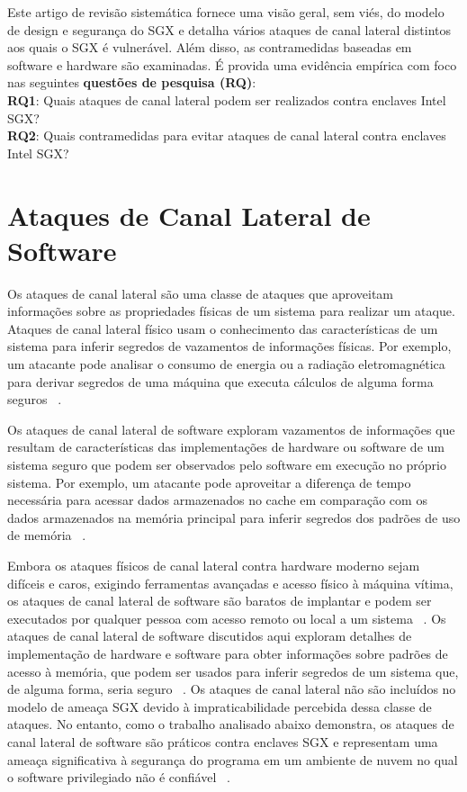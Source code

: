 \documentclass[review]{elsarticle}
\begin{document}
Este artigo de revisão sistemática fornece uma visão geral, sem viés, do modelo de design e segurança do SGX e detalha vários ataques de canal lateral distintos aos quais o SGX é vulnerável. Além disso, as contramedidas baseadas em software e hardware são examinadas. É provida uma evidência empírica com foco nas seguintes \textbf{questões de pesquisa (RQ)}: \\\textbf{RQ1}: Quais ataques de canal lateral podem ser realizados contra enclaves Intel SGX?\\ \textbf{RQ2}: Quais contramedidas para evitar ataques de canal lateral contra enclaves Intel SGX?

\section{Ataques de Canal Lateral de Software}

Os ataques de canal lateral são uma classe de ataques que aproveitam informações sobre as propriedades físicas de um sistema para realizar um ataque. Ataques de canal lateral físico usam o conhecimento das características de um sistema para inferir segredos de vazamentos de informações físicas. Por exemplo, um atacante pode analisar o consumo de energia ou a radiação eletromagnética para derivar segredos de uma máquina que executa cálculos de alguma forma seguros ~\cite{standaert_introduction_2010}.

Os ataques de canal lateral de software exploram vazamentos de informações que resultam de características das implementações de hardware ou software de um sistema seguro que podem ser observados pelo software em execução no próprio sistema. Por exemplo, um atacante pode aproveitar a diferença de tempo necessária para acessar dados armazenados no cache em comparação com os dados armazenados na memória principal para inferir segredos dos padrões de uso de memória ~\cite{costan_intel_2016}.

Embora os ataques físicos de canal lateral contra hardware moderno sejam difíceis e caros, exigindo ferramentas avançadas e acesso físico à máquina vítima, os ataques de canal lateral de software são baratos de implantar e podem ser executados por qualquer pessoa com acesso remoto ou local a um sistema ~\cite{costan_intel_2016}. Os ataques de canal lateral de software discutidos aqui exploram detalhes de implementação de hardware e software para obter informações sobre padrões de acesso à memória, que podem ser usados para inferir segredos de um sistema que, de alguma forma, seria seguro ~\cite{gotzfried_cache_2017, schwarz_malware_2017, xu_controlled-channel_2015, shinde_preventing_2015}. Os ataques de canal lateral não são incluídos no modelo de ameaça SGX devido à impraticabilidade percebida dessa classe de ataques. No entanto, como o trabalho analisado abaixo demonstra, os ataques de canal lateral de software são práticos contra enclaves SGX e representam uma ameaça significativa à segurança do programa em um ambiente de nuvem no qual o software privilegiado não é confiável ~\cite{moghimi_cachezoom:_2017, intel_corporation_tutorial_2015}.
\end{document}
